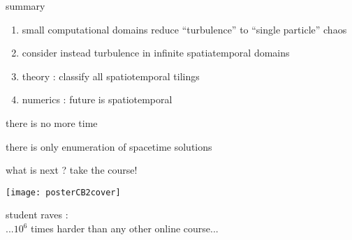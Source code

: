 \begin{frame}{summary}
\begin{enumerate}
              \item
small computational domains reduce ``turbulence'' to ``single particle'' chaos
              \item
consider instead turbulence in infinite spatiatemporal domains
              \item
theory : classify all spatiotemporal tilings
              \item
numerics : future is spatiotemporal
\end{enumerate}

\vfill

there is no more time

\medskip

there is only enumeration of spacetime solutions
\end{frame}

\begin{frame}{what is next ?
take the course!}
\begin{center}
\texttt{[image: posterCB2cover]}
\end{center}
\vfill
student raves : \\
...$10^6$ times harder than any other online course...
\end{frame}

